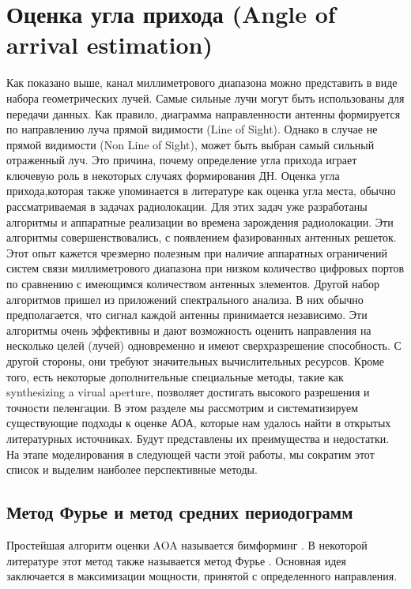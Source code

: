 \section{Оценка угла прихода (Angle of arrival estimation)}

Как показано выше, канал миллиметрового диапазона можно представить в виде
набора геометрических лучей.  Самые сильные лучи могут быть
использованы для передачи данных. Как правило, диаграмма направленности
антенны формируется по направлению луча прямой видимости (Line of Sight).
Однако в случае не прямой видимости (Non Line of Sight), может быть
выбран самый сильный отраженный луч. Это причина, почему определение угла
прихода играет ключевую роль в некоторых случаях формирования ДН. Оценка угла
прихода,которая также упоминается в литературе как оценка угла места,
обычно рассматриваемая в задачах радиолокации. Для этих задач уже
разработаны алгоритмы и аппаратные реализации во времена зарождения радиолокации. Эти
алгоритмы совершенствовались, с появлением фазированных антенных решеток.
Этот опыт кажется чрезмерно полезным при наличие аппаратных ограничений систем
связи миллиметрового диапазона при низком количество цифровых портов по сравнению с имеющимся
количеством антенных элементов.  Другой набор алгоритмов пришел из приложений
спектрального анализа. В них обычно предполагается, что сигнал каждой антенны
принимается независимо.  Эти алгоритмы очень эффективны и дают возможность
оценить направления на несколько целей (лучей) одновременно и имеют
сверхразрешение способность. С другой стороны, они
требуют значительных вычислительных ресурсов.
Кроме того, есть некоторые дополнительные специальные методы, такие как
synthesizing a virual aperture, позволяет достигать высокого разрешения и
точности пеленгации. 
В этом разделе мы рассмотрим и систематизируем существующие подходы
к оценке АОА, которые нам удалось найти в открытых литературных источниках.
Будут представлены их преимущества и недостатки.  
На этапе моделирования в следующей части этой работы, мы сократим этот список и
выделим наиболее перспективные методы.

\subsection{Метод Фурье и метод средних периодограмм}

Простейшая алгоритм оценки AOA называется бимформинг \cite{Tuncer2009, Stoica2005}. В
некоторой литературе этот метод также называется метод Фурье \cite{Allen2006}. 
Основная идея заключается в максимизации мощности, принятой с определенного
направления.

